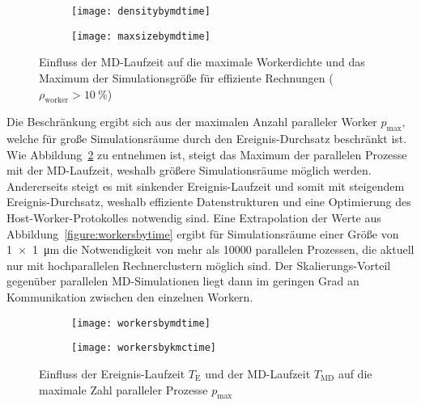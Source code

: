 \begin{figure}[p]
  \captionsetup[subfigure]{singlelinecheck=false}
  \def\subfigwidth{7cm}
  \begin{subfigure}[t]{\subfigwidth}
    \texttt{[image: densitybymdtime]}
  \end{subfigure}
  \hfill
  \begin{subfigure}[t]{\subfigwidth}
    \texttt{[image: maxsizebymdtime]}
  \end{subfigure}

  \caption{Einfluss der MD-Laufzeit auf die maximale Workerdichte und das Maximum der Simulationsgröße für effiziente Rechnungen ($\rho_\text{worker} > \SI{10}{\percent}$)}
  \label{fig:densitymaxsize}

\end{figure}

Die Beschränkung ergibt sich aus der maximalen Anzahl paralleler Worker $p_\text{max}$, welche für große Simulationsräume durch den Ereignis-Durchsatz beschränkt ist.
Wie Abbildung~\ref{fig:workersbytime} zu entnehmen ist, steigt das Maximum der parallelen Prozesse mit der MD-Laufzeit, weshalb größere Simulationsräume möglich werden.
Andererseits steigt es mit sinkender Ereignis-Laufzeit und somit mit steigendem Ereignis-Durchsatz, weshalb effiziente Datenstrukturen und eine Optimierung des Host-Worker-Protokolles notwendig sind.
Eine Extrapolation der Werte aus Abbildung~\ref{figure:workersbytime} ergibt für Simulationsräume einer Größe von \SI{1x1}{\micro\meter} die Notwendigkeit von mehr als \num{10000} parallelen Prozessen, die aktuell nur mit hochparallelen Rechnerclustern möglich sind.
Der Skalierungs-Vorteil gegenüber parallelen MD-Simulationen liegt dann im geringen Grad an Kommunikation zwischen den einzelnen Workern.

\begin{figure}[p]

  \captionsetup[subfigure]{singlelinecheck=false}
  \def\subfigwidth{7cm}
  \begin{subfigure}[t]{\subfigwidth}
    \texttt{[image: workersbymdtime]}
  \end{subfigure}
  \hfill
  \begin{subfigure}[t]{\subfigwidth}
    \texttt{[image: workersbykmctime]}
  \end{subfigure}

  \caption{Einfluss der Ereignis-Laufzeit $T_\text{E}$ und der MD-Laufzeit $T_\text{MD}$ auf die maximale Zahl paralleler Prozesse $p_\text{max}$}
  \label{fig:workersbytime}

\end{figure}

